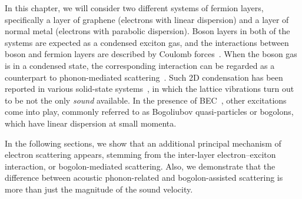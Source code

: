 In this chapter, we will consider two different systems of fermion layers, specifically a layer of graphene (electrons with linear dispersion) and a layer of normal metal (electrons with parabolic dispersion).
Boson layers in both of the systems are expected as a condensed exciton gas, and the interactions between boson and fermion layers are described by Coulomb forces~\cite{Boev:2018ab,Kochereshko:2016aa, Matuszewski:2012aa}.
When the boson gas is in a condensed state, the corresponding interaction can be regarded as a counterpart to phonon-mediated scattering~\cite{Kovalev:2011aa, Kovalev:2013aa, Batyev:2014aa}.
Such 2D condensation has been reported in various solid-state systems~\cite{Butov:2003aa,Kasprzak:2006aa,Schneider:2013aa},
%
in which the lattice vibrations turn out to be not the only \textit{sound} available.
In the presence of BEC~\cite{Butov:2003aa}, other excitations come into play, commonly referred to as Bogoliubov quasi-particles or bogolons, which have linear dispersion at small momenta.

In the following sections, we show that an additional principal mechanism of electron scattering appears, stemming from the inter-layer electron--exciton interaction, or bogolon-mediated scattering.
Also, we demonstrate that the difference between acoustic phonon-related and bogolon-assisted scattering is more than just the magnitude of the sound velocity.
%


